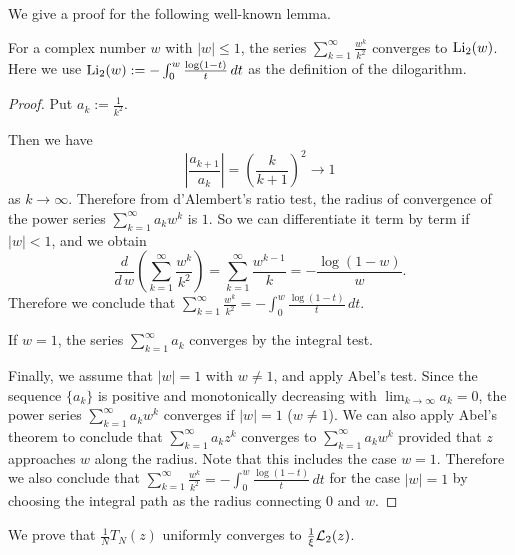 We give a proof for the following well-known lemma.
\begin{lem}\label{lem:Li_2_convergence}
For a complex number $w$ with $|w|\le1$, the series $\sum_{k=1}^{\infty}\frac{w^k}{k^2}$ converges to $\operatorname{Li}_2(w)$.
Here we use $\operatorname{Li}_2(w):=-\int_{0}^{w}\frac{\log(1-t)}{t}\,dt$ as the definition of the dilogarithm.
\end{lem}
\begin{proof}
Put $a_k:=\frac{1}{k^2}$.
\par
Then we have
\begin{equation*}
  \left|\frac{a_{k+1}}{a_{k}}\right|
  =
  \left(\frac{k}{k+1}\right)^2
  \to
  1
\end{equation*}
as $k\to\infty$.
Therefore from d'Alembert's ratio test, the radius of convergence of the power series $\sum_{k=1}^{\infty}a_kw^k$ is $1$.
So we can differentiate it term by term if $|w|<1$, and we obtain
\begin{equation*}
  \frac{d}{d\,w}
  \left(\sum_{k=1}^{\infty}\frac{w^k}{k^2}\right)
  =
  \sum_{k=1}^{\infty}\frac{w^{k-1}}{k}
  =
  -\frac{\log(1-w)}{w}.
\end{equation*}
Therefore we conclude that $\sum_{k=1}^{\infty}\frac{w^k}{k^2}=-\int_{0}^{w}\frac{\log(1-t)}{t}\,dt$.
\par
If $w=1$, the series $\sum_{k=1}^{\infty}a_k$ converges by the integral test.
\par
Finally, we assume that $|w|=1$ with $w\ne1$, and apply Abel's test.
Since the sequence $\{a_k\}$ is positive and monotonically decreasing with $\lim_{k\to\infty}a_k=0$, the power series $\sum_{k=1}^{\infty}a_kw^k$ converges if $|w|=1$ ($w\ne1$).
We can also apply Abel's theorem to conclude that $\sum_{k=1}^{\infty}a_kz^k$ converges to $\sum_{k=1}^{\infty}a_kw^k$ provided that $z$ approaches $w$ along the radius.
Note that this includes the case $w=1$.
Therefore we also conclude that $\sum_{k=1}^{\infty}\frac{w^k}{k^2}=-\int_{0}^{w}\frac{\log(1-t)}{t}\,dt$ for the case $|w|=1$ by choosing the integral path as the radius connecting $0$ and $w$.
\end{proof}
\par
We prove that $\frac{1}{N}T_{N}(z)$ uniformly converges to $\frac{1}{\xi}\mathcal{L}_{2}(z)$.
